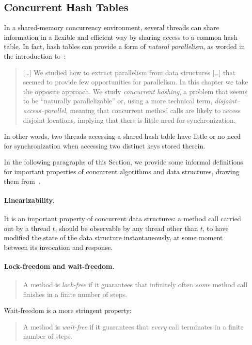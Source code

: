 \subsection{Concurrent Hash Tables}\label{subsec:concurrent-hash-tables}

In a shared-memory concurrency environment, several threads can share information in a flexible and efficient way by sharing access to a common hash table.
In fact, hash tables can provide a form of \emph{natural parallelism}, as worded in the introduction to~\cite[Chapter~13]{art-mp}:
\begin{quote}
[\ldots]
    We studied how to extract parallelism from data structures [\ldots] that seemed to provide few opportunities for parallelism.
    In this chapter we take the opposite approach.
    We study \emph{{concurrent hashing}}, a problem that seems to be ``naturally parallelizable'' or, using a more technical term, \emph{{disjoint--access--parallel}}, meaning that concurrent method calls are likely to access disjoint locations, implying that there is little need for synchronization.
\end{quote}
In other words, two threads accessing a shared hash table have little or no need for synchronization when accessing two distinct keys stored therein.

In the following paragraphs of this Section, we provide some informal definitions for important properties of concurrent algorithms and data structures, drawing them from~\cite[]{art-mp}.

\paragraph{Linearizability.}
It is an important property of concurrent data structures: a method call carried out by a thread $t$, should be observable by any thread other than $t$, to have modified the state of the data structure instantaneously, at some moment between its invocation and response.

\paragraph{Lock-freedom and wait-freedom.}
\begin{quote}
    A method is \emph{lock-free} if it guarantees that infinitely often \emph{some} method call finishes in a finite number of steps.
\end{quote}
Wait-freedom is a more stringent property:
\begin{quote}
    A method is \emph{wait-free} if it guarantees that \emph{every} call terminates in a finite number of steps.
\end{quote}

